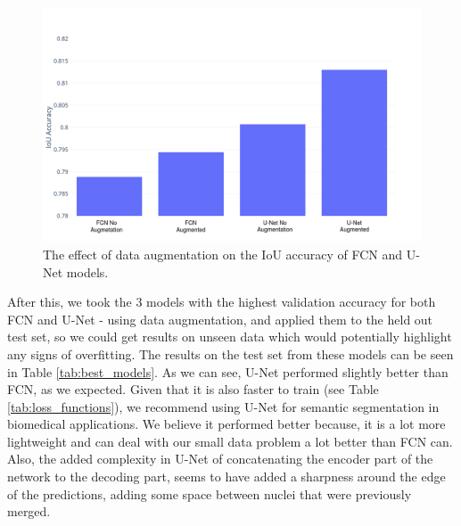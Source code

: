 \documentclass{article}
\begin{document}
\begin{figure}[htbp]
\vskip 5mm
\begin{center}
\centerline{\includegraphics[scale=0.20]{mlp-cw3-template/Figures/BarChart.png}}
\caption{The effect of data augmentation on the IoU accuracy of FCN and U-Net models.}
\label{fig:augmentationbarchart}
\end{center}
\vskip -5mm
\end{figure}

After this, we took the 3 models with the highest validation accuracy for both FCN and U-Net - using data augmentation, and applied them to the held out test set, so we could get results on unseen data which would potentially highlight any signs of overfitting. The results on the test set from these models can be seen in Table \ref{tab:best_models}. As we can see, U-Net performed slightly better than FCN, as we expected. Given that it is also faster to train (see Table \ref{tab:loss_functions}), we recommend using U-Net for semantic segmentation in biomedical applications. We believe it performed better because, it is a lot more lightweight and can deal with our small data problem a lot better than FCN can. Also, the added complexity in U-Net of concatenating the encoder part of the network to the decoding part, seems to have added a sharpness around the edge of the predictions, adding some space between nuclei that were previously merged.
\end{document}
